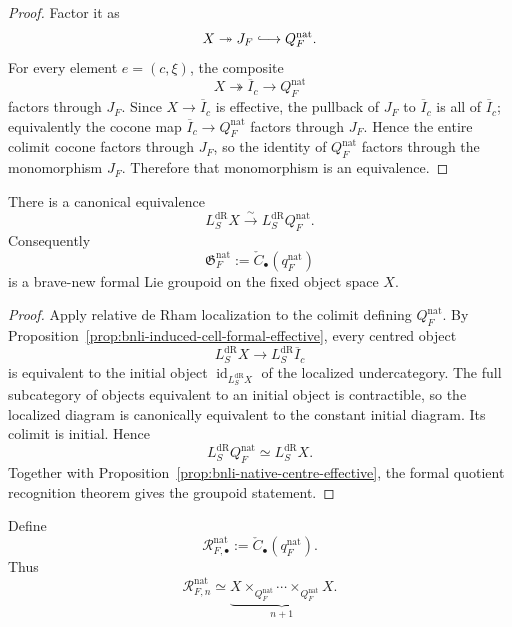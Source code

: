 \begin{proof}
Factor it as
\[
    X\twoheadrightarrow J_F\lhook\joinrel\longrightarrow Q_F^{\mathrm{nat}}.
\]
For every element $e=(c,\xi)$, the composite
\[
    X\twoheadrightarrow\overline I_c\longrightarrow Q_F^{\mathrm{nat}}
\]
factors through $J_F$.  Since $X\to\overline I_c$ is effective, the pullback
of $J_F$ to $\overline I_c$ is all of $\overline I_c$; equivalently the cocone
map $\overline I_c\to Q_F^{\mathrm{nat}}$ factors through $J_F$.  Hence the
entire colimit cocone factors through $J_F$, so the identity of
$Q_F^{\mathrm{nat}}$ factors through the monomorphism $J_F$.  Therefore that
monomorphism is an equivalence.
\end{proof}

\begin{theorem}
\label{thm:bnli-native-quotient-formal}
There is a canonical equivalence
\[
\boxed{
    L_S^{\mathrm{dR}}X
    \xrightarrow{\sim}
    L_S^{\mathrm{dR}}Q_F^{\mathrm{nat}}.}
\]
Consequently
\[
\boxed{
    \mathfrak G_F^{\mathrm{nat}}
    :=
    \check C_\bullet(q_F^{\mathrm{nat}})}
\]
is a brave-new formal Lie groupoid on the fixed object space $X$.
\end{theorem}

\begin{proof}
Apply relative de Rham localization to the colimit defining
$Q_F^{\mathrm{nat}}$.  By
Proposition~\ref{prop:bnli-induced-cell-formal-effective}, every centred object
\[
    L_S^{\mathrm{dR}}X
    \longrightarrow
    L_S^{\mathrm{dR}}\overline I_c
\]
is equivalent to the initial object
$\operatorname{id}_{L_S^{\mathrm{dR}}X}$ of the localized undercategory.  The
full subcategory of objects equivalent to an initial object is contractible,
so the localized diagram is canonically equivalent to the constant initial
diagram.  Its colimit is initial.  Hence
\[
    L_S^{\mathrm{dR}}Q_F^{\mathrm{nat}}
    \simeq
    L_S^{\mathrm{dR}}X.
\]
Together with Proposition~\ref{prop:bnli-native-centre-effective}, the formal
quotient recognition theorem gives the groupoid statement.
\end{proof}

\begin{definition}
\label{def:bnli-raw-integrated-relation}
Define
\[
\boxed{
    \mathcal R^{\mathrm{nat}}_{F,\bullet}
    :=
    \check C_\bullet(q_F^{\mathrm{nat}}).}
\]
Thus
\[
    \mathcal R^{\mathrm{nat}}_{F,n}
    \simeq
    \underbrace{
      X\times_{Q_F^{\mathrm{nat}}}\cdots
      \times_{Q_F^{\mathrm{nat}}}X
    }_{n+1}.
\]
\end{definition}

